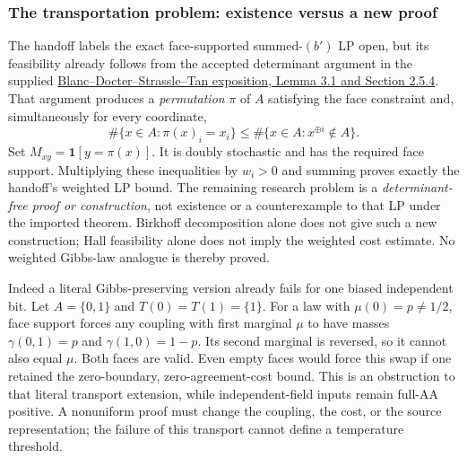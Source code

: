 \subsubsection{The transportation problem: existence versus a new proof}

The handoff labels the exact face-supported summed-$(b')$ LP open, but
its feasibility already follows from the accepted determinant argument
in the supplied
\href{https://arxiv.org/abs/2611.11626}{Blanc--Docter--Strassle--Tan
exposition, Lemma 3.1 and Section 2.5.4}. That argument produces a
\emph{permutation} $\pi$ of $A$ satisfying the face constraint and,
simultaneously for every coordinate,
\[
 \#\{x\in A:\pi(x)_i=x_i\}
 \le\#\{x\in A:x^{\oplus i}\notin A\}.
\]
Set $M_{xy}=\mathbf1[y=\pi(x)]$. It is doubly stochastic and has the
required face support. Multiplying these inequalities by $w_i>0$ and
summing proves exactly the handoff's weighted LP bound. The remaining
research problem is a \emph{determinant-free proof or construction},
not existence or a counterexample to that LP under the imported theorem.
Birkhoff decomposition alone does not give such a new construction;
Hall feasibility alone does not imply the weighted cost estimate.
No weighted Gibbs-law analogue is thereby proved.

Indeed a literal Gibbs-preserving version already fails for one biased
independent bit. Let $A=\{0,1\}$ and $T(0)=T(1)=\{1\}$. For a law
with $\mu(0)=p\ne1/2$, face support forces any coupling with first
marginal $\mu$ to have masses $\gamma(0,1)=p$ and
$\gamma(1,0)=1-p$. Its second marginal is reversed, so it cannot also
equal $\mu$. Both faces are valid. Even empty faces would force this
swap if one retained the zero-boundary, zero-agreement-cost bound.
This is an obstruction to that literal transport extension, while
independent-field inputs remain full-AA positive. A nonuniform proof
must change the coupling, the cost, or the source representation; the
failure of this transport cannot define a temperature threshold.
